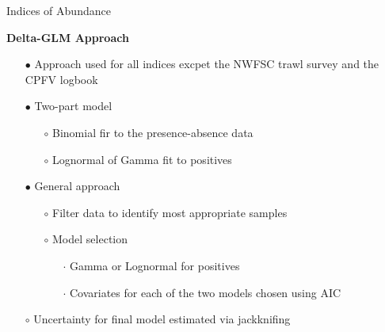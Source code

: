 \documentclass[ignorenonframetext,]{beamer}
\begin{document}
\begin{frame}{Indices of Abundance}

\textbf{Delta-GLM Approach}

\begin{itemize}
\item[$\bullet$] Approach used for all indices excpet the NWFSC trawl survey and the CPFV logbook 
\item[$\bullet$] Two-part model
\begin{itemize}
\item[$\circ$] Binomial fir to the presence-absence data
\item[$\circ$] Lognormal of Gamma fit to positives
\end{itemize}
\item[$\bullet$] General approach 
\begin{itemize}
\item[$\circ$] Filter data to identify most appropriate samples 
\item[$\circ$] Model selection
\begin{itemize}
\item[$\cdot$] Gamma or Lognormal for positives
\item[$\cdot$] Covariates for each of the two models chosen using AIC
\end{itemize}
\end{itemize}
\item[$\circ$] Uncertainty for final model estimated via jackknifing 
\end{itemize}

\end{frame}
\end{document}
